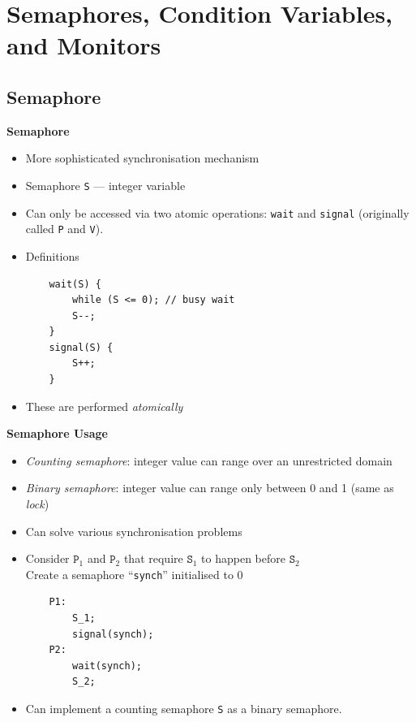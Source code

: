 \documentclass[11pt,a4paper]{article}
\begin{document}
\break{}

\section{Semaphores, Condition Variables, and Monitors}

\subsection{Semaphore}

\textbf{Semaphore}
\begin{itemize}
    \item More sophisticated synchronisation mechanism
    \item Semaphore \texttt{S} --- integer variable
    \item Can only be accessed via two atomic operations: \texttt{wait} and \texttt{signal}
        (originally called \texttt{P} and \texttt{V}).
    \item Definitions
        \begin{verbatim}
    wait(S) {
        while (S <= 0); // busy wait
        S--;
    }
    signal(S) {
        S++;
    }
        \end{verbatim}
    \item These are performed \emph{atomically}
\end{itemize}

\textbf{Semaphore Usage}
\begin{itemize}
    \item \emph{Counting semaphore}: integer value can range over an unrestricted domain
    \item \emph{Binary semaphore}: integer value can range only between 0 and 1
        (same as \emph{lock})
    \item Can solve various synchronisation problems
    \item Consider $\texttt{P}_1$ and $\texttt{P}_2$ that require $\texttt{S}_1$ to
        happen before $\texttt{S}_2$ \\
        Create a semaphore ``\texttt{synch}'' initialised to 0
        \begin{verbatim}
    P1:
        S_1;
        signal(synch);
    P2:
        wait(synch);
        S_2;
        \end{verbatim}
    \item Can implement a counting semaphore \texttt{S} as a binary semaphore.
\end{itemize}
\end{document}
